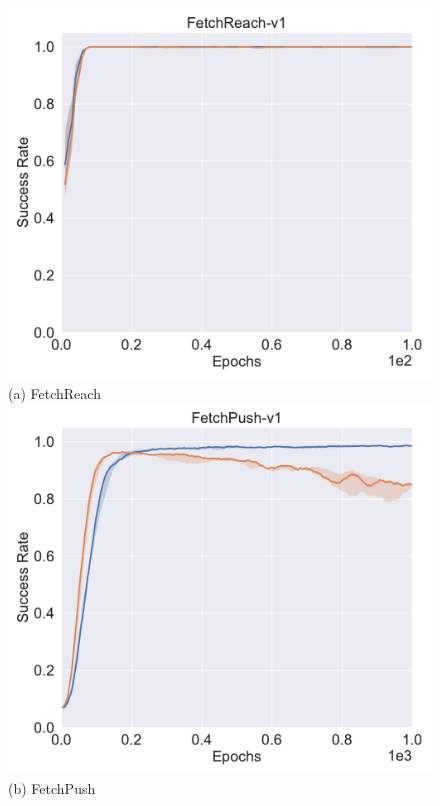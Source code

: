 \begin{figure}[H]
\centering
{}
  \centering
  \includegraphics[width=\linewidth]{figures/chapter3/reach_hs.pdf}
  ({a}) FetchReach
\endminipage
{}%
  \centering
  \includegraphics[width=\linewidth]{figures/chapter3/push_hs.pdf}
  ({b}) FetchPush
\endminipage\hfill
{}%
  \centering

\end{figure}
